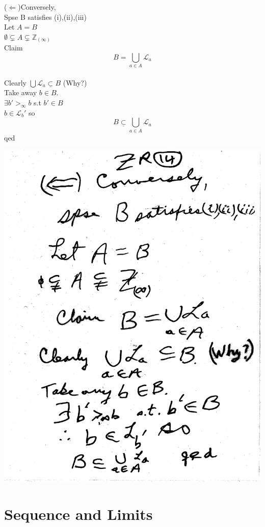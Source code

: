 \documentclass[10pt,a4paper]{article}
\begin{document}
\begin{enumerate}[(ii)]
\newpage
($\Leftarrow$)Conversely,
\\Spse B satisfies (i),(ii),(iii)
\\Let $A=B$
\\$\emptyset \subsetneq A \subsetneq \mathbb{Z}_{(\infty)}$
\\Claim $$B=\bigcup_{a \in A} \mathcal{L}_a $$ 
\\Clearly $ \bigcup \mathcal{L}_a \underline{\subset} B$ (Why?)
\\Take away $b \in B$. 
\\ $\exists b' >_\infty b$ s.t $b' \in B$
\\ $b \in \mathcal{L}_b{'}$ so
\\ $$B \underline{\subset} \bigcup_{a \in A} \mathcal{L}_a$$ qed

\includegraphics[scale=.5]{Pages/ZR_14}

\end{enumerate}

\section{Sequence and Limits}
\end{document}
